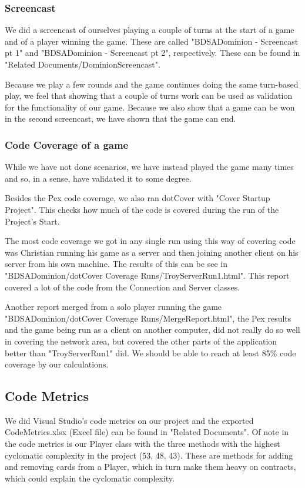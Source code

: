 \documentclass[12pt,a4paper,notitlepage]{article}
\begin{document}
\subsubsection{Screencast}
We did a screencast of ourselves playing a couple of turns at the start of a game and of a player winning the game. These are called "BDSADominion - Screencast pt 1" and "BDSADominion - Screencast pt 2", respectively. These can be found in "Related Documents/DominionScreencast".

Because we play a few rounds and the game continues doing the same turn-based play, we feel that showing that a couple of turns work can be used as validation for the functionality of our game. Because we also show that a game can be won in the second screencast, we have shown that the game can end.

\subsubsection{Code Coverage of a game}
While we have not done scenarios, we have instead played the game many times and so, in a sense, have validated it to some degree.

Besides the Pex code coverage, we also ran dotCover with "Cover Startup Project". This checks how much of the code is covered during the run of the Project's Start. 

The most code coverage we got in any single run using this way of covering code was Christian running his game as a server and then joining another client on his server from his own machine. The results of this can be see in "BDSADominion/dotCover Coverage Runs/TroyServerRun1.html". This report covered a lot of the code from the Connection and Server classes. 

Another report merged from a solo player running the game "BDSADominion/dotCover Coverage Runs/Merge\textunderscore Report.html", the Pex results and the game being run as a client on another computer, did not really do so well in covering the network area, but covered the other parts of the application better than "TroyServerRun1" did. We should be able to reach at least 85\% code coverage by our calculations.

\subsection{Code Metrics}
We did Visual Studio's code metrics on our project and the exported CodeMetrics.xlsx (Excel file) can be found in "Related Documents".
Of note in the code metrics is our Player class with the three methods with the highest cyclomatic complexity in the project (53, 48, 43).  These are methods for adding and removing cards from a Player, which in turn make them heavy on contracts, which could explain the cyclomatic complexity.
\end{document}
